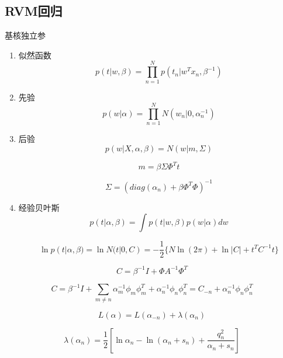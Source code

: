 \subsection{RVM回归}
基核独立参
\begin{enumerate}
\item 似然函数
\begin{equation}
p(t|w,\beta) = \prod_{n=1}^Np(t_n|w^Tx_n, \beta^{-1})
\end{equation}
\item 先验
\begin{equation}
p(w|\alpha) = \prod_{n=1}^NN(w_n|0, \alpha_n^{-1})
\end{equation}

\item 后验
\begin{equation}
p(w|X, \alpha, \beta) = N(w|m, \Sigma)
\end{equation}

\begin{equation}
m = \beta\Sigma\Phi^Tt
\end{equation}

\begin{equation}
\Sigma = (diag(\alpha_n) + \beta\Phi^T\Phi)^{-1}
\end{equation}
\item 经验贝叶斯
\begin{equation}
p(t|\alpha, \beta) = \int p(t|w,\beta)p(w|\alpha)dw
\end{equation}

\begin{equation}
\ln p(t|\alpha, \beta) = \ln N(t|0, C)
= -\frac{1}{2}\{N \ln(2\pi) + \ln|C| + t^TC^{-1}t\}
\end{equation}

\end{enumerate}

\begin{equation}
C = \beta^{-1}I + \Phi A^{-1}\Phi^T
\end{equation}

\begin{equation}
C = \beta^{-1}I + \sum_{m\neq n}\alpha_{m}^{-1}\phi_m\phi_m^T 
+ \alpha_n^{-1}\phi_n\phi_n^T
= C_{-n} + \alpha_n^{-1}\phi_n\phi_n^T 
\end{equation}

\begin{equation}
L(\alpha) = L(\alpha_{-n}) + \lambda(\alpha_n)
\end{equation}

\begin{equation}
\lambda(\alpha_n) = \frac{1}{2}
[\ln \alpha_n - \ln(\alpha_n + s_n) + \frac{q_n^2}{\alpha_n + s_n}]
\end{equation}

